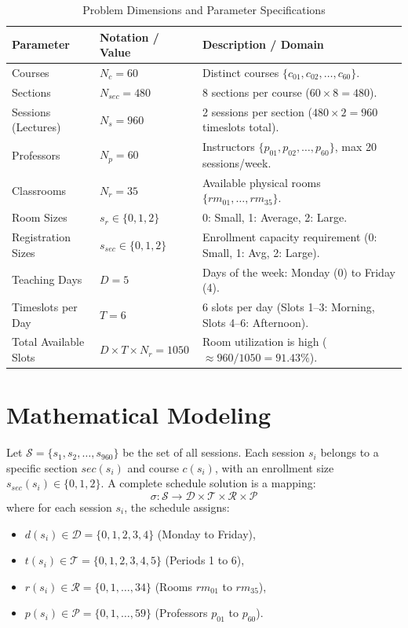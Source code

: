 \documentclass[12pt,a4paper]{report}
\begin{document}
\begin{table}[H]
  \centering
  \small
  \caption{Problem Dimensions and Parameter Specifications}
  \label{tab:problem_dimensions}
  \begin{tabularx}{\linewidth}{L{4.2cm} L{3.0cm} X}
    \toprule
    \color{PrismWhite}\textbf{Parameter} & 
    \color{PrismWhite}\textbf{Notation / Value} & 
    \color{PrismWhite}\textbf{Description / Domain} \\
    \midrule
    Courses & $N_c = 60$ & Distinct courses $\{c_{01}, c_{02}, \dots, c_{60}\}$. \\
    Sections & $N_{sec} = 480$ & 8 sections per course ($60 \times 8 = 480$). \\
    Sessions (Lectures) & $N_s = 960$ & 2 sessions per section ($480 \times 2 = 960$ timeslots total). \\
    Professors & $N_p = 60$ & Instructors $\{p_{01}, p_{02}, \dots, p_{60}\}$, max 20 sessions/week. \\
    Classrooms & $N_r = 35$ & Available physical rooms $\{rm_{01}, \dots, rm_{35}\}$. \\
    Room Sizes & $s_r \in \{0, 1, 2\}$ & 0: Small, 1: Average, 2: Large. \\
    Registration Sizes & $s_{sec} \in \{0, 1, 2\}$ & Enrollment capacity requirement (0: Small, 1: Avg, 2: Large). \\
    Teaching Days & $D = 5$ & Days of the week: Monday (0) to Friday (4). \\
    Timeslots per Day & $T = 6$ & 6 slots per day (Slots 1--3: Morning, Slots 4--6: Afternoon). \\
    Total Available Slots & $D \times T \times N_r = 1050$ & Room utilization is high ($\approx 960 / 1050 = 91.43\%$). \\
    \bottomrule
  \end{tabularx}
\end{table}

\section{Mathematical Modeling}
Let $\mathcal{S} = \{s_1, s_2, \dots, s_{960}\}$ be the set of all sessions. Each session $s_i$ belongs to a specific section $sec(s_i)$ and course $c(s_i)$, with an enrollment size $s_{sec}(s_i) \in \{0, 1, 2\}$.
A complete schedule solution is a mapping:
\begin{equation}
  \sigma: \mathcal{S} \rightarrow \mathcal{D} \times \mathcal{T} \times \mathcal{R} \times \mathcal{P}
\end{equation}
where for each session $s_i$, the schedule assigns:
\begin{itemize}[leftmargin=1.5em]
  \item $d(s_i) \in \mathcal{D} = \{0, 1, 2, 3, 4\}$ (Monday to Friday),
  \item $t(s_i) \in \mathcal{T} = \{0, 1, 2, 3, 4, 5\}$ (Periods 1 to 6),
  \item $r(s_i) \in \mathcal{R} = \{0, 1, \dots, 34\}$ (Rooms $rm_{01}$ to $rm_{35}$),
  \item $p(s_i) \in \mathcal{P} = \{0, 1, \dots, 59\}$ (Professors $p_{01}$ to $p_{60}$).
\end{itemize}
\end{document}
